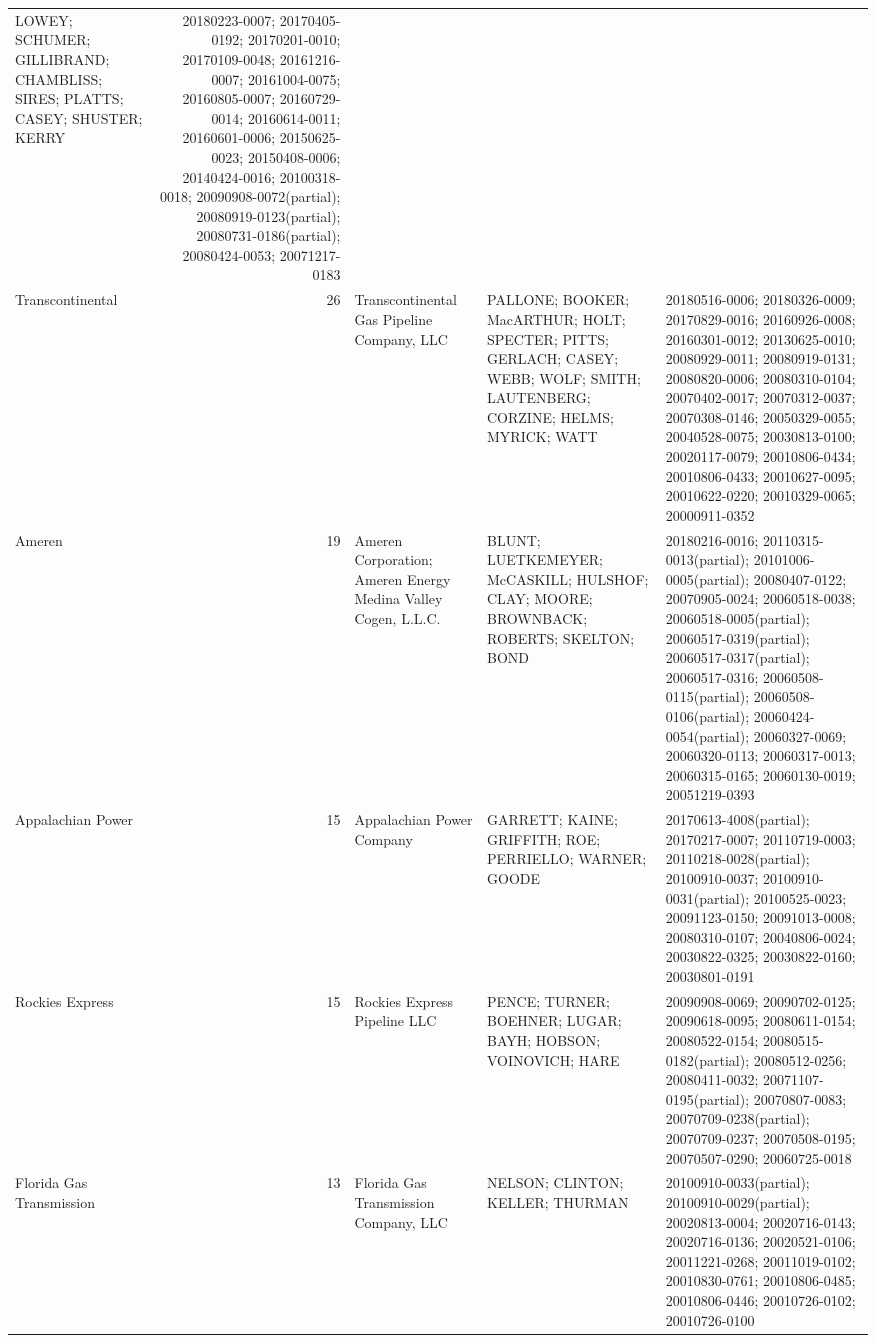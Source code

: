\documentclass[]{article}
\begin{document}
\begin{longtable}[]{@{}lrlll@{}}
LOWEY; SCHUMER; GILLIBRAND; CHAMBLISS; SIRES; PLATTS; CASEY; SHUSTER;
KERRY & 20180223-0007; 20170405-0192; 20170201-0010; 20170109-0048;
20161216-0007; 20161004-0075; 20160805-0007; 20160729-0014;
20160614-0011; 20160601-0006; 20150625-0023; 20150408-0006;
20140424-0016; 20100318-0018; 20090908-0072(partial);
20080919-0123(partial); 20080731-0186(partial); 20080424-0053;
20071217-0183\tabularnewline
Transcontinental & 26 & Transcontinental Gas Pipeline Company, LLC &
PALLONE; BOOKER; MacARTHUR; HOLT; SPECTER; PITTS; GERLACH; CASEY; WEBB;
WOLF; SMITH; LAUTENBERG; CORZINE; HELMS; MYRICK; WATT & 20180516-0006;
20180326-0009; 20170829-0016; 20160926-0008; 20160301-0012;
20130625-0010; 20080929-0011; 20080919-0131; 20080820-0006;
20080310-0104; 20070402-0017; 20070312-0037; 20070308-0146;
20050329-0055; 20040528-0075; 20030813-0100; 20020117-0079;
20010806-0434; 20010806-0433; 20010627-0095; 20010622-0220;
20010329-0065; 20000911-0352\tabularnewline
Ameren & 19 & Ameren Corporation; Ameren Energy Medina Valley Cogen,
L.L.C. & BLUNT; LUETKEMEYER; McCASKILL; HULSHOF; CLAY; MOORE; BROWNBACK;
ROBERTS; SKELTON; BOND & 20180216-0016; 20110315-0013(partial);
20101006-0005(partial); 20080407-0122; 20070905-0024; 20060518-0038;
20060518-0005(partial); 20060517-0319(partial); 20060517-0317(partial);
20060517-0316; 20060508-0115(partial); 20060508-0106(partial);
20060424-0054(partial); 20060327-0069; 20060320-0113; 20060317-0013;
20060315-0165; 20060130-0019; 20051219-0393\tabularnewline
Appalachian Power & 15 & Appalachian Power Company & GARRETT; KAINE;
GRIFFITH; ROE; PERRIELLO; WARNER; GOODE & 20170613-4008(partial);
20170217-0007; 20110719-0003; 20110218-0028(partial); 20100910-0037;
20100910-0031(partial); 20100525-0023; 20091123-0150; 20091013-0008;
20080310-0107; 20040806-0024; 20030822-0325; 20030822-0160;
20030801-0191\tabularnewline
Rockies Express & 15 & Rockies Express Pipeline LLC & PENCE; TURNER;
BOEHNER; LUGAR; BAYH; HOBSON; VOINOVICH; HARE & 20090908-0069;
20090702-0125; 20090618-0095; 20080611-0154; 20080522-0154;
20080515-0182(partial); 20080512-0256; 20080411-0032;
20071107-0195(partial); 20070807-0083; 20070709-0238(partial);
20070709-0237; 20070508-0195; 20070507-0290;
20060725-0018\tabularnewline
Florida Gas Transmission & 13 & Florida Gas Transmission Company, LLC &
NELSON; CLINTON; KELLER; THURMAN & 20100910-0033(partial);
20100910-0029(partial); 20020813-0004; 20020716-0143; 20020716-0136;
20020521-0106; 20011221-0268; 20011019-0102; 20010830-0761;
20010806-0485; 20010806-0446; 20010726-0102;
20010726-0100\tabularnewline
\bottomrule
\end{longtable}
\end{document}
